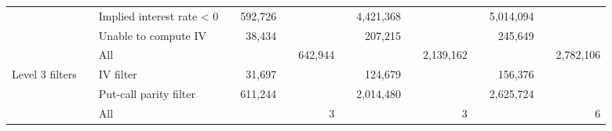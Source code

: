 \begin{tabular}{*{4}{l} *{11}{r} }
				  & & Implied interest rate < 0 & &
				592,726 & &  & &
				4,421,368 & &  & &
				5,014,094 & &  \\
			
				  & & Unable to compute IV & &
				38,434 & &  & &
				207,215 & &  & &
				245,649 & &  \\
			
				  & & All & &
				 & & 642,944 & &
				 & & 2,139,162 & &
				 & & 2,782,106 \\
			
				Level 3 filters & & IV filter & &
				31,697 & &  & &
				124,679 & &  & &
				156,376 & &  \\
			
				  & & Put-call parity filter & &
				611,244 & &  & &
				2,014,480 & &  & &
				2,625,724 & &  \\
			
				  & & All & &
				 & & 3 & &
				 & & 3 & &
				 & & 6 \\
			

	        \hline
	    \end{tabular}
	